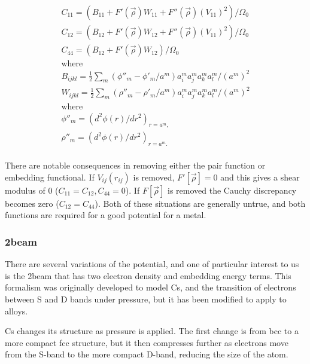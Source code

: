\begin{equation}
\begin{split}
C_{11} = \left( B_{11} + F'(\vec{\rho}) W_{11} + F''(\vec{\rho})(V_{11})^2 \right) / \Omega_0 \\
C_{12} = \left( B_{12} + F'(\vec{\rho}) W_{12} + F''(\vec{\rho})(V_{11})^2 \right) / \Omega_0 \\
C_{44} = \left( B_{12} + F'(\vec{\rho}) W_{12} \right) / \Omega_0 \\
\text{where} \\
B_{ijkl} = \frac{1}{2} \sum_m \left(\phi''_m-\phi'_m/a^m \right) a_i^m a_j^m a_k^m a_l^m/(a^m)^2 \\
W_{ijkl} = \frac{1}{2} \sum_m \left(\rho''_m-\rho'_m/a^m \right) a_i^m a_j^m a_k^m a_l^m/(a^m)^2 \\
\text{where} \\
\phi''_m = \left(d^2\phi(r)/dr^2 \right)_{r=a^m,}\\
\rho''_m = \left(d^2\phi(r)/dr^2 \right)_{r=a^m.}\\
\end{split}
\label{eq:eqCubicCrystalElastic}
\end{equation}

There are notable consequences in removing either the pair function or embedding functional.  If $V_{ij}(r_{ij})$ is removed, $F'[\vec{\rho}] = 0$ and this gives a shear modulus of 0 ($C_{11} = C_{12}, C_{44} = 0$)\cite{dawbaskeseam}.  If $F[\vec{\rho}]$  is removed the Cauchy discrepancy becomes zero ($C_{12} = C_{44}$)\cite{dawbaskeseam}.  Both of these situations are generally untrue, and both functions are required for a good potential for a metal.



\subsubsection{\Acrlong{2beam}}
\label{section:2beam}

There are several variations of the  potential, and one of particular interest to us is the \acrlong{2beam} that has two electron density and embedding energy terms.  This formalism was originally developed to model \Gls{Cs}\cite{twobandackland}, and the transition of electrons between S and D bands under pressure, but it has been modified to apply to alloys.

\Gls{Cs} changes its structure as pressure is applied.  The first change is from \acrshort{bcc} to a more compact \acrshort{fcc} structure, but it then compresses further as electrons move from the S-band to the more compact D-band, reducing the size of the atom.

